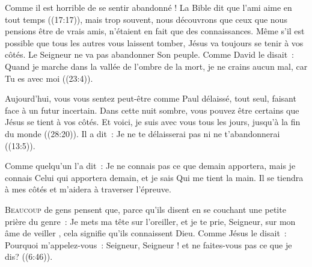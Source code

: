 Comme il est horrible de se sentir abandonné !
 La Bible dit que \og l'ami 
 aime en tout temps \fg{} ((17:17)), mais trop souvent,
 nous découvrons que ceux que nous pensions être de vrais amis,
 n'étaient en fait que des connaissances.
 Même s'il est possible que tous les autres vous laissent tomber,
 Jésus va toujours se tenir à vos côtés.
 Le Seigneur ne va pas abandonner Son peuple.
 Comme David le disait~: 
 \og Quand je marche dans la vallée de l'ombre de la mort,
 je ne crains aucun mal, car Tu es avec moi \fg{} ((23:4)).


Aujourd'hui, vous vous sentez peut-être comme Paul \ocadr délaissé,
 tout seul, faisant face à un futur incertain.
 Dans cette nuit sombre, vous pouvez être certains que Jésus
 se tient à vos côtés.
 \og Et voici, je suis avec vous tous les jours, jusqu'à la fin du monde \fg{}
 ((28:20)).
 Il a dit~: 
 \og Je ne te délaisserai pas ni ne t'abandonnerai \fg{}
 ((13:5)). 

Comme quelqu'un l'a dit~: 
 \og Je ne connais 
 pas ce que demain apportera, mais je connais Celui qui apportera demain,
 et je sais Qui me tient la main. \fg{}
 Il se tiendra à mes côtés et m'aidera à traverser l'épreuve. 

\dvrule






\lettrine{B}{eaucoup} de gens pensent que,
 parce qu'ils disent en se couchant une petite prière
 du genre~: 
 \og Je mets ma tête sur l'oreiller, et je te prie, Seigneur,
 sur mon âme de veiller \fg{}, cela signifie qu'ils connaissent Dieu.
 Comme Jésus le disait~: 
 \og Pourquoi m'appelez-vous~: Seigneur, Seigneur !
 et ne faites-vous pas ce que je dis? \fg{} ((6:46)).

